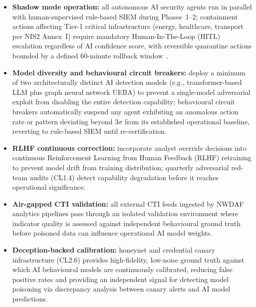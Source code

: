 \begin{enumerate}
\begin{itemize}
  \item \textbf{Shadow mode operation:} all autonomous AI security agents run in
        parallel with human-supervised rule-based SIEM during Phases~1--2;
        containment actions affecting Tier-1 critical infrastructure (energy,
        healthcare, transport per NIS2 Annex~I) require mandatory Human-In-The-Loop
        (HITL) escalation regardless of AI confidence score, with reversible quarantine
        actions bounded by a defined 60-minute rollback window~\cite{nis2}.
  \item \textbf{Model diversity and behavioural circuit breakers:} deploy a minimum
        of two architecturally distinct AI detection models (e.g., transformer-based
        LLM plus graph neural network UEBA) to prevent a single-model adversarial
        exploit from disabling the entire detection capability; behavioural circuit
        breakers automatically suspend any agent exhibiting an anomalous action rate
        or pattern deviating beyond $3\sigma$ from its established operational
        baseline, reverting to rule-based SIEM until re-certification.
  \item \textbf{RLHF continuous correction:} incorporate analyst override decisions
        into continuous Reinforcement Learning from Human Feedback (RLHF) retraining
        to prevent model drift from training distribution; quarterly adversarial
        red-team audits (CL1.4) detect capability degradation before it reaches
        operational significance.
  \item \textbf{Air-gapped CTI validation:} all external CTI feeds ingested by
        NWDAF analytics pipelines pass through an isolated validation environment
        where indicator quality is assessed against independent behavioural ground
        truth before poisoned data can influence operational AI model weights.
  \item \begin{sloppypar}\textbf{Deception-backed calibration:} honeynet and credential canary
        infrastructure (CL2.6) provides high-fidelity, low-noise ground truth against
        which AI behavioural models are continuously calibrated, reducing false
        positive rates and providing an independent signal for detecting model
        poisoning via discrepancy analysis between canary alerts and AI model
        predictions.\end{sloppypar}
\end{itemize}


\end{enumerate}
